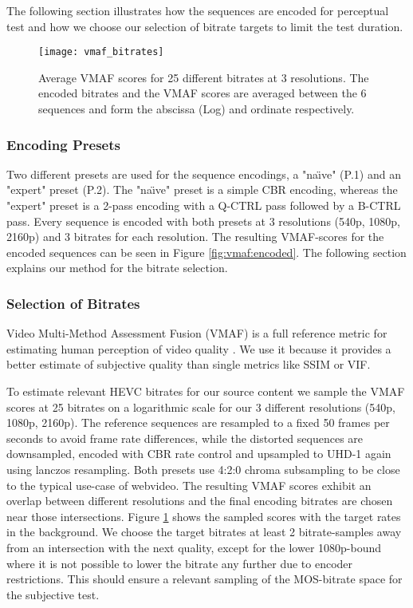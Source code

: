 The following section illustrates how the sequences are encoded for perceptual test and how we choose our selection of bitrate targets to limit the test duration. 

\begin{figure}[bht!]
	\centering
	\texttt{[image: vmaf\_bitrates]}
	\caption{Average VMAF scores for 25 different bitrates at 3 resolutions. The encoded bitrates and the VMAF scores are averaged between the 6 sequences and form the abscissa (Log) and ordinate respectively.}
	\label{fig:vmaf:bitrates}
\end{figure}

\subsubsection{Encoding Presets}
Two different presets are used for the sequence encodings, a "na\"{\i}ve" (P.1) and an "expert" preset (P.2). The "na\"{\i}ve" preset is a simple CBR encoding, whereas the "expert" preset is a 2-pass encoding with a Q-CTRL pass followed by a B-CTRL pass.  Every sequence is encoded with both presets at 3 resolutions (540p, 1080p, 2160p) and 3 bitrates for each resolution. The resulting VMAF-scores for the encoded sequences can be seen in Figure \ref{fig:vmaf:encoded}. The following section explains our method for the bitrate selection.

\subsubsection{Selection of Bitrates}
Video Multi-Method Assessment Fusion (VMAF) is a full reference metric for estimating human perception of video quality \cite{lin2013:mmf}. We use it because it provides a better estimate of subjective quality than single metrics like SSIM or VIF.

To estimate relevant HEVC bitrates for our source content we sample the VMAF scores at 25 bitrates on a logarithmic scale for our 3 different resolutions (540p, 1080p, 2160p). The reference sequences are resampled to a fixed 50 frames per seconds to avoid frame rate differences, while the distorted sequences are downsampled, encoded with CBR rate control and upsampled to UHD-1 again using lanczos resampling. Both presets use 4:2:0 chroma subsampling to be close to the typical use-case of webvideo. The resulting VMAF scores exhibit an overlap between different resolutions and the final encoding bitrates are chosen near those intersections. Figure \ref{fig:vmaf:bitrates} shows the sampled scores with the target rates in the background. We choose the target bitrates at least 2 bitrate-samples away from an intersection with the next quality, except for the lower 1080p-bound where it is not possible to lower the bitrate any further due to encoder restrictions. This should ensure a relevant sampling of the MOS-bitrate space for the subjective test.

